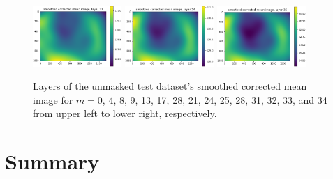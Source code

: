 \documentclass[letterpaper,11pt]{article}
\begin{document}
\begin{figure}[!ht]
\includegraphics[width=0.3\textwidth]{images/results/unmasked_smoothed_corrected_mean_image_layers/unmasked_smoothed_corrected_mean_image_layer_33}
\includegraphics[width=0.3\textwidth]{images/results/unmasked_smoothed_corrected_mean_image_layers/unmasked_smoothed_corrected_mean_image_layer_34}
\includegraphics[width=0.3\textwidth]{images/results/unmasked_smoothed_corrected_mean_image_layers/unmasked_smoothed_corrected_mean_image_layer_35}
\caption{\footnotesize Layers of the unmasked test dataset's smoothed corrected mean image for $m=$0, 4, 8, 9, 13, 17, 28, 21, 24, 25, 28, 31, 32, 33, and 34 from upper left to lower right, respectively.}
\label{fig:unmasked_smoothed_corrected_mean_image_layers}
\end{figure}

\section{Summary}
\label{sec:summary}

\clearpage

\end{document}
